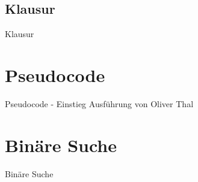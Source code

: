 \documentclass[18pt]{beamer}
\begin{document}
\subsection{Klausur}
\begin{frame}{Klausur}
 
\end{frame}


\section{Pseudocode}
\begin{frame}{Pseudocode - Einstieg}
 Ausführung von Oliver Thal
\end{frame}

\section{Binäre Suche}
\begin{frame}[fragile]{Binäre Suche}
 \begin{algorithmic}
  
  \EndFunction
 \end{algorithmic}
\end{frame}
\end{document}

